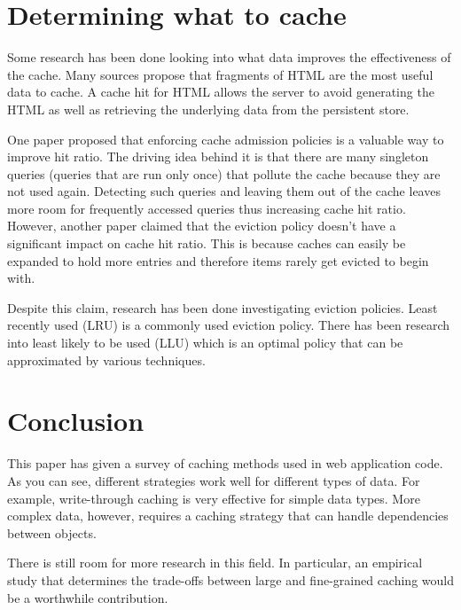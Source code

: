\documentclass[12pt]{article}
\begin{document}
\section{Determining what to cache}
Some research has been done looking into what data improves the effectiveness of the cache.
Many sources propose that fragments of HTML are the most useful data to cache.\cite{comparisonOfCachingSolutions}\cite{scalableConsistentCaching}
A cache hit for HTML allows the server to avoid generating the HTML as well as retrieving the underlying data from the persistent store.\cite{howBasecampGotSoFast}

One paper proposed that enforcing cache admission policies is a valuable way to improve hit ratio.\cite{cacheAdmissionPolicies}
The driving idea behind it is that there are many singleton queries (queries that are run only once) that pollute the cache because they are not used again.
Detecting such queries and leaving them out of the cache leaves more room for frequently accessed queries thus increasing cache hit ratio.
However, another paper claimed that the eviction policy doesn't have a significant impact on cache hit ratio.\cite{refreshingPerspectiveSearch}
This is because caches can easily be expanded to hold more entries and therefore items rarely get evicted to begin with.\cite{refreshingPerspectiveSearch}

Despite this claim, research has been done investigating eviction policies.
Least recently used (LRU) is a commonly used eviction policy.
There has been research into least likely to be used (LLU) which is an optimal policy that can be approximated by various techniques.

\section{Conclusion}
This paper has given a survey of caching methods used in web application code.
As you can see, different strategies work well for different types of data.
For example, write-through caching is very effective for simple data types.
More complex data, however, requires a caching strategy that can handle dependencies between objects.

There is still room for more research in this field.
In particular, an empirical study that determines the trade-offs between large and fine-grained caching would be a worthwhile contribution.

\end{document}
